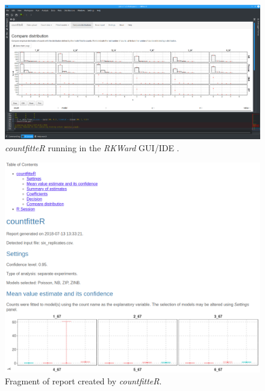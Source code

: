 \begin{figure}[htbp]
  \centering
  \includegraphics[width=0.99\columnwidth]{fig_gui}
  \caption{\emph{countfitteR} running in the \emph{RKWard} GUI/IDE \citep{rodiger_rkward:_2012}.}
  \label{figure:fig_gui.png}
\end{figure}

\begin{figure}[htbp]
  \centering
  \includegraphics[width=0.99\columnwidth]{cj_rep}
  \caption{Fragment of report created by \emph{countfitteR}.}
  \label{figure:cj_rep.png}
\end{figure}

% 

